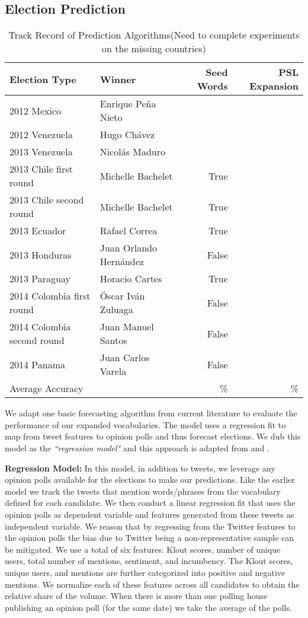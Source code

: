 \subsection{Election Prediction}
\begin{table*}[ht]
	\centering
	\begin{tabular}{| l |l| r | r |}
		\hline
		Election Type & Winner& Seed Words & PSL Expansion\\
		\hline
		2012 Mexico & Enrique Peña Nieto&  &  \\
		2012 Venezuela & Hugo Ch\'{a}vez& &\\
		2013 Venezuela & Nicolás Maduro & & \\
		2013 Chile first round & Michelle Bachelet & True& \\
		2013 Chile second round & Michelle Bachelet  & True & \\
		2013 Ecuador & Rafael Correa & True& \\
		2013 Honduras & Juan Orlando Hernández  & False& \\
		2013 Paraguay & Horacio Cartes & True& \\
		2014 Colombia first round & Óscar Iván Zuluaga & False& \\
		2014 Colombia second round & Juan Manuel Santos & False& \\
		2014 Panama & Juan Carlos Varela& False& \\\hline
		Average Accuracy &    & \%& \%\\
		\hline
	\end{tabular}
	\caption{Track Record of Prediction Algorithms(Need to complete experiments on the missing countries)}
	\label{table:trackRecord}
\end{table*}

We adapt one basic forecasting algorithm from current literature to evaluate the
performance of our expanded vocabularies. The model uses a regression fit to map from tweet features to opinion polls and thus forecast elections. We dub this model as the \emph{``regression model"} and this approach is adapted from \cite{bermingham2011using} and \cite{o2010tweets}.

{\bf Regression Model:}
In this model, in addition to tweets, we leverage any opinion polls available for the elections 
to make our predictions.
Like the earlier model we track the tweets that mention words/phrases
from the vocabulary defined for each candidate.
We then conduct a linear regression fit that uses the opinion polls as dependent variable and features generated from 
these tweets as independent variable.
We reason that by regressing from the Twitter features to the opinion polls the bias due to Twitter being a non-representative sample
can be mitigated.
We use a total of six features: Klout scores, number of unique users, total number of mentions, sentiment, and incumbency.
The Klout scores, unique users, and mentions are further categorized into positive and negative mentions.
We normalize each of these features across all candidates to obtain the relative share of the volume. 
When there is more than one polling house publishing an opinion poll (for the same date) we take the average of the polls. 

